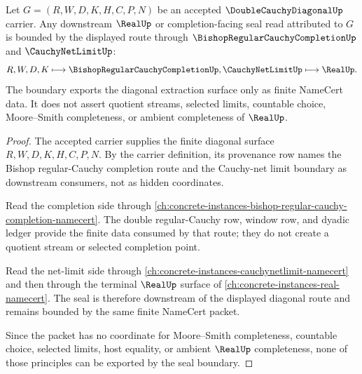 \begin{theorem}
\label{thm:double-cauchy-diagonal-real-seal-boundary}
Let $G=(R,W,D,K,H,C,P,N)$ be an accepted $\DoubleCauchyDiagonalUp$ carrier. Any downstream $\RealUp$ or completion-facing seal read attributed to $G$ is bounded by the displayed route through $\BishopRegularCauchyCompletionUp$ and $\CauchyNetLimitUp$:
$$
R,W,D,K \longmapsto \BishopRegularCauchyCompletionUp,\CauchyNetLimitUp \longmapsto \RealUp .
$$
The boundary exports the diagonal extraction surface only as finite NameCert data. It does not assert quotient streams, selected limits, countable choice, Moore--Smith completeness, or ambient completeness of $\RealUp$.
\end{theorem}
\begin{proof}
The accepted carrier supplies the finite diagonal surface $R,W,D,K,H,C,P,N$. By the carrier definition, its provenance row names the Bishop regular-Cauchy completion route and the Cauchy-net limit boundary as downstream consumers, not as hidden coordinates.

Read the completion side through \autoref{ch:concrete-instances-bishop-regular-cauchy-completion-namecert}. The double regular-Cauchy row, window row, and dyadic ledger provide the finite data consumed by that route; they do not create a quotient stream or selected completion point.

Read the net-limit side through \autoref{ch:concrete-instances-cauchynetlimit-namecert} and then through the terminal $\RealUp$ surface of \autoref{ch:concrete-instances-real-namecert}. The seal is therefore downstream of the displayed diagonal route and remains bounded by the same finite NameCert packet.

Since the packet has no coordinate for Moore--Smith completeness, countable choice, selected limits, host equality, or ambient $\RealUp$ completeness, none of those principles can be exported by the seal boundary.
\end{proof}



